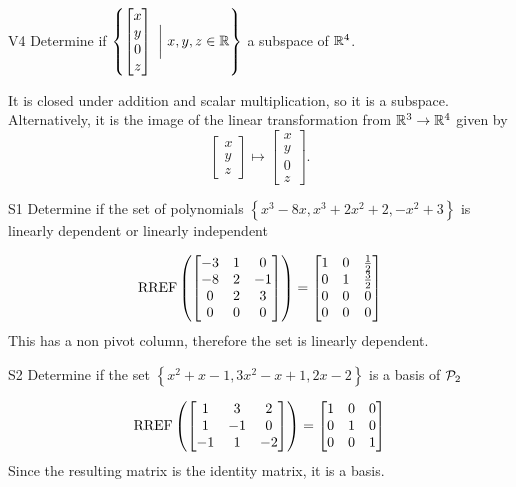 \documentclass{sbgLAexam}
\begin{document}
\begin{problem}{V4}
Determine if $\left\{ \begin{bmatrix} x \\ y \\ 0 \\ z \end{bmatrix}\  \bigg|\ x,y,z \in \IR\right\}$  a subspace of $\IR^4$.
\end{problem}
\begin{solution}
It is closed under addition and scalar multiplication, so it is a subspace.  Alternatively, it is the image of the linear transformation from $\IR^3 \rightarrow \IR^4$ given by $$\begin{bmatrix} x \\ y \\ z \end{bmatrix} \mapsto  \begin{bmatrix} x \\ y \\ 0 \\ z \end{bmatrix}.$$
\end{solution}


\begin{extract}\newpage\end{extract}
\begin{problem}{S1}
Determine if the set of polynomials $\left\{ x^3-8x, x^3+2x^2+2, -x^2+3\right\}$ is  linearly dependent or linearly independent
\end{problem}
\begin{solution}
$$\RREF\left( \begin{bmatrix}-3 & 1 & 0 \\ -8 & 2 & -1 \\ 0 & 2 & 3 \\ 0 & 0 & 0\end{bmatrix}\right) = \begin{bmatrix} 1 & 0 & \frac{1}{2} \\ 0 & 1 & \frac{3}{2} \\ 0 & 0 & 0 \\ 0 & 0 & 0 \end{bmatrix}$$ 
This has a non pivot column, therefore the set is linearly dependent.
\end{solution}


\begin{problem}{S2}
Determine if the set $\left\{ x^2+x-1, 3x^2-x+1, 2x-2 \right\}$ is a basis of $\P_2$
\end{problem}
\begin{solution}
$$\RREF\left(\begin{bmatrix} 1 & 3 & 2 \\ 1 & -1 & 0 \\ -1 & 1 & -2 \end{bmatrix} \right)= \begin{bmatrix} 1 & 0 &0 \\ 0 & 1 & 0 \\ 0 & 0 & 1\end{bmatrix}$$
Since the resulting matrix is the identity matrix, it is a basis.
\end{solution}
\end{document}
